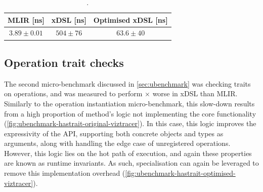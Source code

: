 \begin{table}[H]
  \caption{.}
  \label{tab:ubenchmark-instantiation-optimised}
  \centering
  \begin{tabular}{ccc}
    \toprule
    \textbf{MLIR [ns]} & \textbf{xDSL [ns]} & \textbf{Optimised xDSL [ns]} \\
    \midrule
    $3.89 \pm 0.01$ & $504 \pm 76$ & $63.6 \pm 40$\\
    \bottomrule
  \end{tabular}
\end{table}









\subsection{Operation trait checks}
\label{ssec:specialising-ubenchmarks-trait}

The second micro-benchmark discussed in \autoref{sec:ubenchmark} was checking traits on operations, and was measured to perform $\times$ worse in xDSL than MLIR.
Similarly to the operation instantiation micro-benchmark, this slow-down results from a high proportion of method's logic not implementing the core functionality (\autoref{fig:ubenchmark-hastrait-original-viztracer}). In this case, this logic improves the expressivity of the API, supporting both concrete objects and types as arguments, along with handling the edge case of unregistered operations. However, this logic lies on the hot path of execution, and again these properties are known as runtime invariants. As such, specialisation can again be leveraged to remove this implementation overhead (\autoref{fig:ubenchmark-hastrait-optimised-viztracer}).

